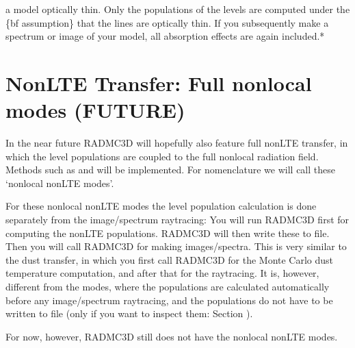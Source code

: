 \documentclass[letterpaper,10pt,english]{sphinxmanual}
\begin{document}

 a model optically thin. Only
the populations of the levels are computed under the \{bf assumption\}
that the lines are optically thin. If you subsequently make a spectrum
or image of your model, all absorption effects are again included.*


\section{Non\sphinxhyphen{}LTE Transfer: Full non\sphinxhyphen{}local modes (FUTURE)}
\label{\detokenize{lineradtrans:non-lte-transfer-full-non-local-modes-future}}\label{\detokenize{lineradtrans:sec-nonlte-nonlocal}}
In the near future RADMC\sphinxhyphen{}3D will hopefully also feature full non\sphinxhyphen{}LTE transfer,
in which the level populations are coupled to the full non\sphinxhyphen{}local radiation
field. Methods such as  and 
will be implemented. For nomenclature we will call these ‘non\sphinxhyphen{}local non\sphinxhyphen{}LTE
modes’.

For these non\sphinxhyphen{}local non\sphinxhyphen{}LTE modes the level population calculation is done
separately from the image/spectrum ray\sphinxhyphen{}tracing: You will run RADMC\sphinxhyphen{}3D first
for computing the non\sphinxhyphen{}LTE populations. RADMC\sphinxhyphen{}3D will then write these to
file. Then you will call RADMC\sphinxhyphen{}3D for making images/spectra. This is very
similar to the dust transfer, in which you first call RADMC\sphinxhyphen{}3D for the Monte
Carlo dust temperature computation, and after that for the ray\sphinxhyphen{}tracing.  It
is, however, different from the  modes, where the
populations are calculated automatically before any image/spectrum
ray\sphinxhyphen{}tracing, and the populations do not have to be written to file (only if
you want to inspect them: Section {\hyperref[\detokenize{lineradtrans:sec-nonlte-write-levelpop}]{}}).

For now, however, RADMC\sphinxhyphen{}3D still does not have the non\sphinxhyphen{}local non\sphinxhyphen{}LTE
modes.
\end{document}
